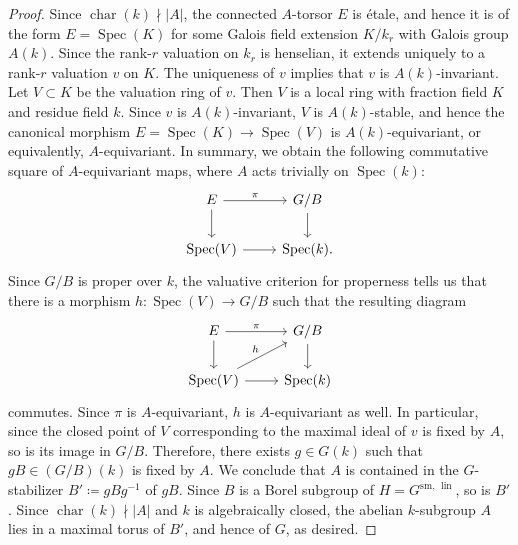 \documentclass[12pt]{amsart}
\numberwithin{equation}{section}
\theoremstyle{remark}
\newcommand{\Spec}{\operatorname{Spec}}
\newcommand{\Char}{\operatorname{char}}
\newcommand{\lin}{\operatorname{lin}}
\newcommand{\Glin}{G^{\mathrm{sm}, \, \lin}}
\begin{document}
\begin{proof}
 Since $\Char(k)\nmid |A|$, the connected $A$-torsor $E$ is \'etale, and hence it is of the form $E = \Spec(K)$ for some Galois field extension $K/k_r$ with Galois group $A(k)$. Since the rank-$r$ valuation on $k_r$ is henselian, it extends uniquely to a rank-$r$ valuation $v$ on $K$. The uniqueness of $v$ implies that $v$ is $A(k)$-invariant. Let $V\subset K$ be the valuation ring of $v$. Then $V$ is a local ring with fraction field $K$ and residue field $k$. Since $v$ is $A(k)$-invariant, $V$ is $A(k)$-stable, and hence the canonical morphism $E=\Spec(K)\longrightarrow \Spec(V)$ is $A(k)$-equivariant, or equivalently, $A$-equivariant. In summary, we obtain the following commutative square of $A$-equivariant maps, where $A$ acts trivially on $\Spec(k)$:
\[
\begin{tikzcd}
E \arrow[r, "\pi"] \arrow[d] & G/B \arrow[d] \\
\Spec(V) \arrow[r] & \Spec(k).
\end{tikzcd}
\]
Since $G/B$ is proper over $k$, the valuative criterion for properness tells us that there is a morphism
$h \colon \Spec(V) \to G/B$ such that the resulting diagram
\[
\begin{tikzcd}
E \arrow[r, "\pi"] \arrow[d] & G/B \arrow[d] \\
\Spec(V) \arrow[ur, "h"] \arrow[r] & \Spec(k)
\end{tikzcd}
\]
commutes. Since $\pi$ is $A$-equivariant, $h$ is $A$-equivariant as well. In particular, since the closed point of $V$ corresponding to the maximal ideal of $v$ is fixed by $A$, so is its image in $G/B$. Therefore, there exists $g\in G(k)$ such that $gB \in (G/B)(k)$ is fixed by $A$. We conclude that $A$ is contained in the $G$-stabilizer $B'\coloneqq gBg^{-1}$ of $gB$. Since $B$ is a Borel subgroup of $H = \Glin$, so is $B'$. Since $\Char(k)\nmid |A|$ and $k$ is algebraically closed, the abelian $k$-subgroup $A$ lies in a maximal torus of $B'$, and hence of $G$, as desired.
\end{proof}
\end{document}
